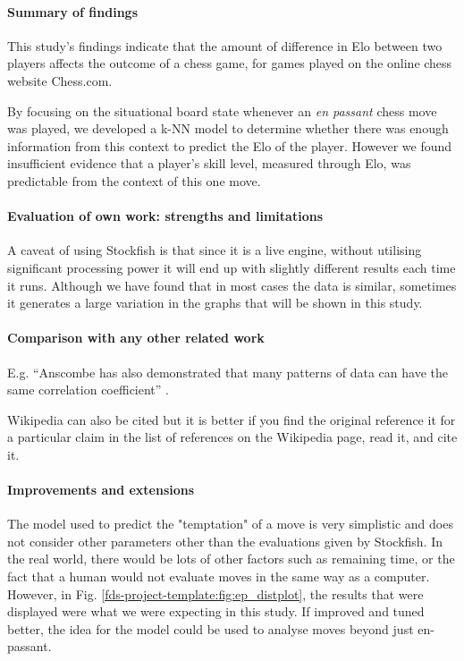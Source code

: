 \documentclass[10pt,a4paper]{article}
\begin{document}
\begin{multicols}{2}
\paragraph{Summary of findings}
This study's findings indicate that the amount of difference in Elo between two players affects the outcome of a chess game, for games played on the online chess website Chess.com. 

By focusing on the situational board state whenever an \textit{en passant} chess move was played, we developed a k-NN model to determine whether there was enough information from this context to predict the Elo of the player. However we
found insufficient evidence that a player's skill level, measured through Elo, was predictable from the context of this one move.




\paragraph{Evaluation of own work: strengths and limitations}
A caveat of using Stockfish is that since it is a live engine, without utilising significant processing power it will end up with slightly different results each time it runs. Although we have found that in most cases the data is similar, sometimes it generates a large variation in the graphs that will be shown in this study.



\paragraph{Comparison with any other related work}
E.g. ``Anscombe has also demonstrated that many patterns of data can
have the same correlation coefficient'' \cite{anscombe1973graphs}.

Wikipedia can also be cited but it is better if you find the original
reference it for a particular claim in the list of references on the
Wikipedia page, read it, and cite it.


\paragraph{Improvements and extensions}

The model used to predict the "temptation" of a move is very simplistic and does not consider other parameters other than the evaluations given by Stockfish. In the real world, there would be lots of other factors such as remaining time, or the fact that a human would not evaluate moves in the same way as a computer. However, in Fig. \ref{fds-project-template:fig:ep_distplot}, the results that were displayed were what we were expecting in this study. If improved and tuned better, the idea for the model could be used to analyse moves beyond just en-passant.

\end{multicols}

\printbibliography
\end{document}
